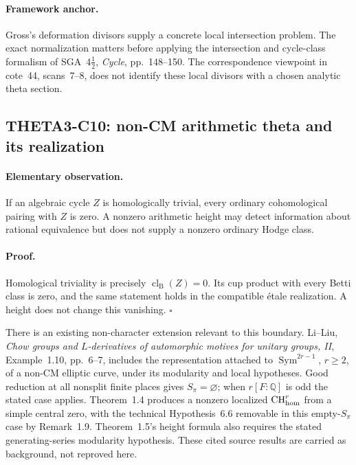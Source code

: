 \documentclass[11pt]{article}
\newcommand{\Q}{\mathbb Q}\newcommand{\C}{\mathbb C}\newcommand{\Z}{\mathbb Z}\newcommand{\R}{\mathbb R}\newcommand{\A}{\mathbb A}\newcommand{\OO}{\mathcal O}
\theoremstyle{definition}\newtheorem{definition}[theorem]{Definition}\newtheorem{remark}[theorem]{Remark}
\begin{document}
\paragraph{Framework anchor.}
Gross's deformation divisors supply a concrete local intersection problem.
The exact normalization matters before applying the intersection and
cycle-class formalism of SGA~4$\frac12$, \emph{Cycle}, pp.~148--150.
The correspondence viewpoint in cote~44, scans~7--8, does not identify
these local divisors with a chosen analytic theta section.

\subsection{THETA3-C10: non-CM arithmetic theta and its realization}\label{C10}

\paragraph{Elementary observation.}
If an algebraic cycle $Z$ is homologically trivial, every ordinary
cohomological pairing with $Z$ is zero. A nonzero arithmetic height
may detect information about rational equivalence but does not
supply a nonzero ordinary Hodge class.

\paragraph{Proof.}
Homological triviality is precisely
$\operatorname{cl}_{\mathrm B}(Z)=0$. Its cup product with every
Betti class is zero, and the same statement holds in the compatible
\'etale realization. A height does not change this vanishing.
$\square$

There is an existing non-character extension relevant to this
boundary. Li--Liu, \emph{Chow groups and $L$-derivatives of
automorphic motives for unitary groups, II}, Example~1.10,
pp.~6--7, includes the representation attached to
$\operatorname{Sym}^{2r-1}$, $r\geq2$, of a non-CM elliptic curve,
under its modularity and local hypotheses. Good reduction at all
nonsplit finite places gives $S_\pi=\varnothing$; when
$r[F:\Q]$ is odd the stated case applies. Theorem~1.4 produces a
nonzero localized $\operatorname{CH}^r_{\mathrm{hom}}$ from a simple central zero,
with the technical Hypothesis~6.6 removable in this empty-$S_\pi$
case by Remark~1.9. Theorem~1.5's height formula also requires the
stated generating-series modularity hypothesis. These cited source
results are carried as background, not reproved here.
\end{document}
